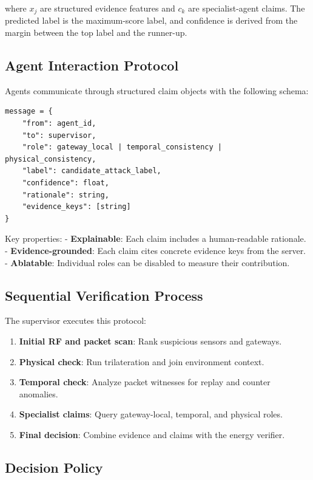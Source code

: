 \documentclass[10pt, twocolumn, letterpaper]{article}
\begin{document}
where $x_j$ are structured evidence features and $c_k$ are specialist-agent claims. The predicted label is the maximum-score label, and confidence is derived from the margin between the top label and the runner-up.

\subsection{Agent Interaction Protocol}

Agents communicate through structured claim objects with the following schema:

\begin{verbatim}
message = {
    "from": agent_id,
    "to": supervisor,
    "role": gateway_local | temporal_consistency | physical_consistency,
    "label": candidate_attack_label,
    "confidence": float,
    "rationale": string,
    "evidence_keys": [string]
}
\end{verbatim}

Key properties:
- \textbf{Explainable}: Each claim includes a human-readable rationale.
- \textbf{Evidence-grounded}: Each claim cites concrete evidence keys from the server.
- \textbf{Ablatable}: Individual roles can be disabled to measure their contribution.

\subsection{Sequential Verification Process}

The supervisor executes this protocol:

\begin{enumerate}
    \item \textbf{Initial RF and packet scan}: Rank suspicious sensors and gateways.
    \item \textbf{Physical check}: Run trilateration and join environment context.
    \item \textbf{Temporal check}: Analyze packet witnesses for replay and counter anomalies.
    \item \textbf{Specialist claims}: Query gateway-local, temporal, and physical roles.
    \item \textbf{Final decision}: Combine evidence and claims with the energy verifier.
\end{enumerate}

\subsection{Decision Policy}
\end{document}
